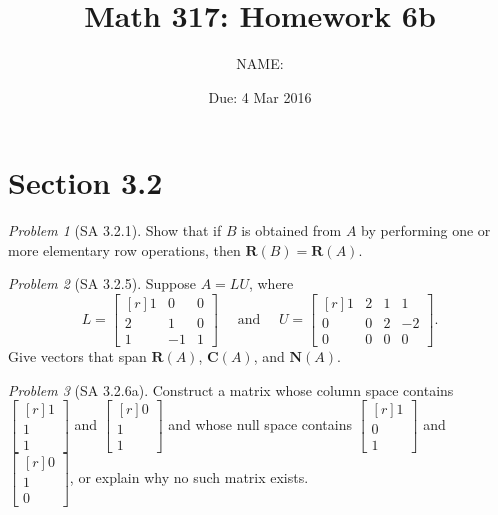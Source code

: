 \documentclass[fleqn,11pt]{paper}
\author         {NAME:                     }
\title{Math 317: Homework 6b}
\date{Due: 4 Mar 2016}
\theoremstyle{remark}
\newtheorem{problem}{Problem}
\newtheorem*{solution}{{\bf Solution}}
\newcommand{\<}{\ensuremath{\langle}}
\renewcommand{\>}{\ensuremath{\rangle}}
\newcommand\bR{\ensuremath{\mathbf R}}
\newcommand\bN{\ensuremath{\mathbf N}}
\newcommand\bC{\ensuremath{\mathbf C}}
\begin{document}
\maketitle

\section*{Section 3.2}

\begin{problem}[SA 3.2.1]
  Show that if $B$ is obtained from $A$ by performing one or more elementary
  row operations, then $\bR(B) = \bR(A)$.
\end{problem}

\newpage
\begin{problem}[SA 3.2.5]
  Suppose $A = LU$, where
  \[
  L =
  \begin{bmatrix*}[r]
    1& 0& 0\\
    2 &1& 0\\
    1& -1& 1
  \end{bmatrix*}
  \quad  \text{ and } \quad U =
  \begin{bmatrix*}[r]
    1 &2& 1& 1\\
    0& 0& 2& -2\\
    0& 0& 0& 0
  \end{bmatrix*}.\]
  Give vectors that span $\bR(A)$, $\bC(A)$, and $\bN(A)$.
\end{problem}
\newpage

\begin{problem}[SA 3.2.6a]
Construct a matrix whose column space contains 
$\begin{bmatrix*}[r] 1\\1\\1 \end{bmatrix*}$ and 
$\begin{bmatrix*}[r] 0\\1\\1 \end{bmatrix*}$ and 
whose null space contains 
$\begin{bmatrix*}[r] 1\\0\\1 \end{bmatrix*}$ and 
$\begin{bmatrix*}[r] 0\\1\\0 \end{bmatrix*}$, or
explain why no such matrix exists.
\end{problem}
\end{document}
